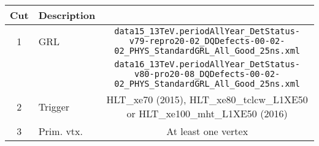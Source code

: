 
\begin{table}[htbp]
  {\small
  \begin{center}\renewcommand\arraystretch{1.4}
   \hspace*{-0.05\textwidth}\begin{tabular}{|c|l|c|c|c|c|c|}
      \hline
      Cut           & Description              & \multicolumn{5}{|c|}{}                                                                                                                              \\
      \hline
      \hline
1                   & GRL                      & \multicolumn{5}{|c|}{{\tiny \tt data15\_13TeV.periodAllYear\_DetStatus-v79-repro20-02\_DQDefects-00-02-02\_PHYS\_StandardGRL\_All\_Good\_25ns.xml}} \\
                    &                          & \multicolumn{5}{|c|}{{\tiny \tt data16\_13TeV.periodAllYear\_DetStatus-v80-pro20-08\_DQDefects-00-02-02\_PHYS\_StandardGRL\_All\_Good\_25ns.xml}}   \\ \hline
\multirow{1}{*}{2}  & \multirow{1}{*}{Trigger} & \multicolumn{5}{|c|}{\footnotesize HLT\_xe70 (2015), HLT\_xe80\_tclcw\_L1XE50 or HLT\_xe100\_mht\_L1XE50 (2016)}                                    \\ \hline


3 & Prim. vtx. & \multicolumn{5}{|c|}{At least one vertex} \\ \hline



\end{tabular}
\end{center}}
\end{table}
